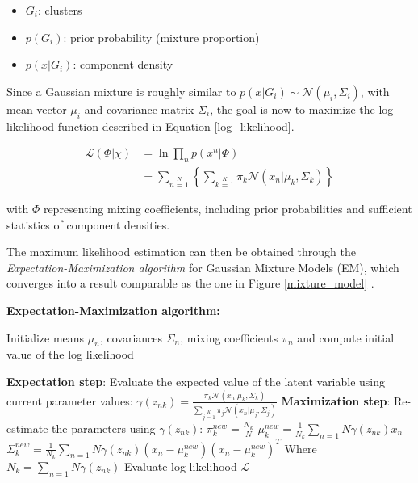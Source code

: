 \begin{itemize}
\item $G_i$: clusters
\item $p(G_i)$: prior probability (mixture proportion)
\item $p(x|G_i)$: component density
\end{itemize}

\noindent Since a Gaussian mixture is roughly similar to $p(x|G_i) \sim \mathcal{N}(\mu_i, \Sigma_i)$, with mean vector $\mu_i$ and covariance matrix $\Sigma_i$, the goal is now to maximize the log likelihood function described in Equation \ref{log_likelihood}.

\begin{equation}
\begin{array}{ll}
\mathcal{L}(\Phi|\chi) & = \ln \prod\limits_n p(x^n | \Phi) \\
 & = \sum\limits_{n=1}\limits^{N} \left\{ \sum \limits_{k=1}\limits^{K} \pi_k \mathcal{N}(x_n|\mu_k, \Sigma_k)\right\}
\end{array}
\label{log_likelihood}
\end{equation}

\noindent with $\Phi$ representing mixing coefficients, including prior probabilities and sufficient statistics of component densities.
\newline

\noindent The maximum likelihood estimation can then be obtained through the \textit{Expectation-Maximization algorithm} for Gaussian Mixture Models (EM), which converges into a result comparable as the one in Figure \ref{mixture_model} \cite{BIS06}.
\newline

\noindent \textbf{Expectation-Maximization algorithm:}
\newline

\begin{algorithmic}
\State Initialize means $\mu_n$, covariances $\Sigma_n$, mixing coefficients $\pi_n$ and compute initial value of the log likelihood

\Repeat
	\State \textbf{Expectation step}: Evaluate the expected value of the latent variable using current parameter values:
		\State $\gamma(z_{nk}) = 
		\frac{\pi_k\mathcal{N}(x_n|\mu_k, \Sigma_k)}{\sum\limits_{j=1}\limits^{K}\pi_j\mathcal{N}(x_n|\mu_j, \Sigma_j)}$
	\State \textbf{Maximization step}: Re-estimate the parameters using $\gamma(z_{nk})$:
		\State $\pi^{new}_k = \frac{N_k}{N}$
		\State $\mu^{new}_k = \frac{1}{N_k}\sum\limits_{n=1}\limits{N}\gamma(z_{nk})x_n$
		\State $\Sigma^{new}_k = \frac{1}{N_k}\sum\limits_{n=1}\limits{N}\gamma(z_{nk}) (x_n - \mu^{new}_k) (x_n - \mu^{new}_k)^T$
		\State Where $N_k = \sum\limits_{n=1}\limits{N}\gamma(z_{nk})$
	\State Evaluate log likelihood $\mathcal{L}$ 
\end{algorithmic}

